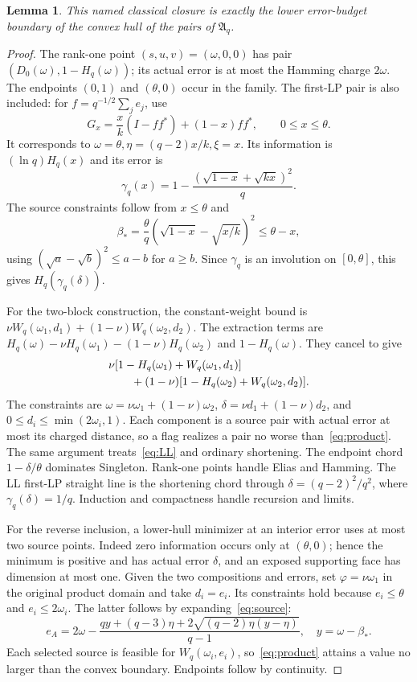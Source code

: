 \documentclass[12pt,letterpaper,onecolumn]{article}
\newtheorem{lemma}[theorem]{Lemma}
\theoremstyle{definition}
\theoremstyle{remark}
\begin{document}
\begin{lemma}\label{lem:closure}
This named classical closure is exactly the lower error-budget boundary of the convex hull of the pairs of \(\mathfrak A_q\).
\end{lemma}
\begin{proof}
The rank-one point \((s,u,v)=(\omega,0,0)\) has pair
\((D_0(\omega),1-H_q(\omega))\); its actual error is at most the Hamming charge \(2\omega\). The endpoints \((0,1)\) and \((\theta,0)\) occur in the family. The first-LP pair is also included: for \(f=q^{-1/2}\sum_je_j\), use
\[
G_x=\frac{x}{k}(I-ff^*)+(1-x)ff^*,\qquad 0\le x\le\theta.
\]
It corresponds to \(\omega=\theta,\eta=(q-2)x/k,\xi=x\).
Its information is \((\ln q)H_q(x)\) and its error is
\[
\gamma_q(x)=1-\frac{(\sqrt{1-x}+\sqrt{kx})^2}{q}.
\]
The source constraints follow from \(x\le\theta\) and
\[
\beta_*=\frac{\theta}{q}
\left(\sqrt{1-x}-\sqrt{x/k}\right)^2\le\theta-x,
\]
using \((\sqrt a-\sqrt b)^2\le a-b\) for \(a\ge b\).
Since \(\gamma_q\) is an involution on \([0,\theta]\), this gives \(H_q(\gamma_q(\delta))\).

For the two-block construction, the constant-weight bound is
\(\nu W_q(\omega_1,d_1)+(1-\nu)W_q(\omega_2,d_2)\).
The extraction terms are
\(H_q(\omega)-\nu H_q(\omega_1)-(1-\nu)H_q(\omega_2)\) and \(1-H_q(\omega)\). They cancel to give
\begin{align}\label{eq:product}
&\nu[1-H_q(\omega_1)+W_q(\omega_1,d_1)]\notag\\
&\qquad +(1-\nu)[1-H_q(\omega_2)+W_q(\omega_2,d_2)].
\end{align}
The constraints are \(\omega=\nu\omega_1+(1-\nu)\omega_2\),
\(\delta=\nu d_1+(1-\nu)d_2\), and
\(0\le d_i\le\min(2\omega_i,1)\).
Each component is a source pair with actual error at most its charged distance, so a flag realizes a pair no worse than~\eqref{eq:product}.
The same argument treats~\eqref{eq:LL} and ordinary shortening. The endpoint chord \(1-\delta/\theta\) dominates Singleton. Rank-one points handle Elias and Hamming. The LL first-LP straight line is the shortening chord through
\(\delta=(q-2)^2/q^2\), where \(\gamma_q(\delta)=1/q\).
Induction and compactness handle recursion and limits.

For the reverse inclusion, a lower-hull minimizer at an interior error uses at most two source points. Indeed zero information occurs only at \((\theta,0)\); hence the minimum is positive and has actual error \(\delta\), and an exposed supporting face has dimension at most one. Given the two compositions and errors, set \(\varphi=\nu\omega_1\) in the original product domain and take \(d_i=e_i\). Its constraints hold because \(e_i\le\theta\) and \(e_i\le2\omega_i\). The latter follows by expanding~\eqref{eq:source}:
\[
e_A=2\omega-\frac{qy+(q-3)\eta+
2\sqrt{(q-2)\eta(y-\eta)}}{q-1},\quad y=\omega-\beta_*.
\]
Each selected source is feasible for \(W_q(\omega_i,e_i)\), so~\eqref{eq:product} attains a value no larger than the convex boundary. Endpoints follow by continuity.
\end{proof}
\end{document}
